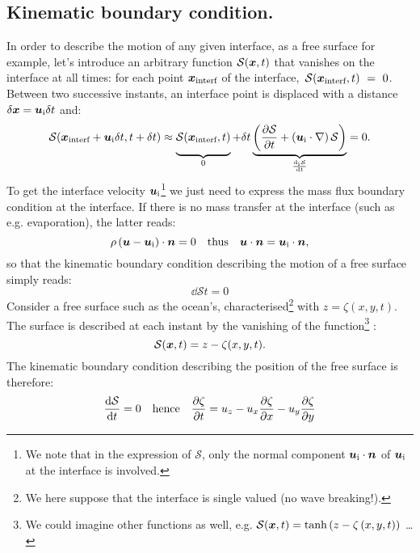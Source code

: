 \subsection{Kinematic boundary condition.} In order to describe the motion of any given interface, as a free surface for example, let's introduce an arbitrary function $\mathcal S(\bx,t)$ that vanishes on the interface at all times: for each point $\bx_\text{interf}$ of the interface,~$\mathcal S(\bx_\text{interf},t)~=~0$. Between two successive instants, an interface point is displaced with a distance $\delbx = \bu_\text i \delt$ and:
\begin{equation}
\mathcal S(\bx_\text{interf} + \bu_\text i \delt, t + \delt) \approx \underbrace{\vphantom{\lp\pd{\mathcal S}{t}\rp}\mathcal S(\bx_\text{interf},t)}_0 + \delt\underbrace{\lp\pd{\mathcal S}{t} + \lp\bu_\text  i \cdot \nabla\rp\mathcal S\rp}_{\dd{_\text i\mathcal S}{t}} = 0.
\end{equation}
To get the interface velocity $\bu_\text i$\footnote{We note that in the expression of $\mathcal S$, only the normal component $\bu_\text i \cdot \bn$ of $\bu_\text i$ at the interface is involved.} we just need to express the mass flux boundary condition at the interface. If there is no mass transfer at the interface (such as e.g. evaporation), the latter reads:
\begin{equation}
\rho \lp \bu - \bu_\text i\rp \cdot \bn = 0 \quad \text{thus} \quad \bu \cdot \bn = \bu_\text i \cdot \bn,
\end{equation}
so that the kinematic boundary condition describing the motion of a free surface simply reads:
\begin{equation}
\dd{\mathcal S}{t} = 0
\end{equation}
 Consider a free surface such as the ocean's, characterised\footnote{We here suppose that the interface is single valued (no wave breaking!).} with $z = \zeta(x,y,t)$. The surface is described at each instant by the vanishing of the function\footnote{We could imagine other functions as well, e.g. $\mathcal S(\bx,t) = \tanh\lp z - \zeta\lp x,y,t\rp\rp$ \ldots} :
\begin{equation}
\mathcal S(\bx,t) = z - \zeta(x,y,t).
\label{eq:bumped_free_surface}
\end{equation}
The kinematic boundary condition describing the position of the free surface is therefore:
\begin{equation}
\frac{\mathrm d \mathcal S}{\mathrm d t} = 0 \quad \text{hence}\quad \frac{\partial \zeta}{\partial t} = u_z - u_x \frac{\partial \zeta}{\partial x} - u_y \frac{\partial \zeta}{\partial y}
\end{equation}
